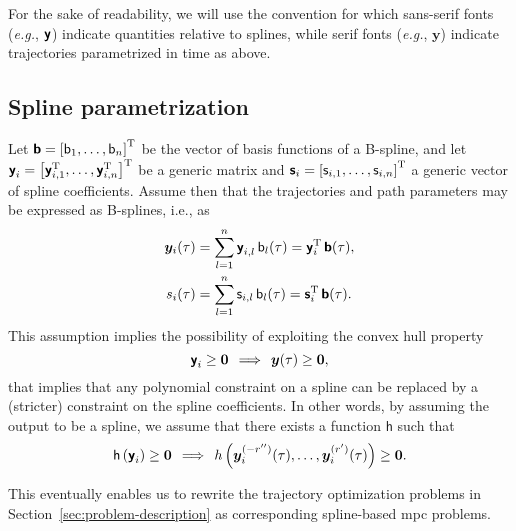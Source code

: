 For the sake of readability, we will use the convention for which sans-serif fonts (\emph{e.g.}, $\boldsymbol{\mathsf{y}}$) indicate quantities relative to splines, while serif fonts (\emph{e.g.}, $\bm{y}$) indicate trajectories parametrized in time as above. %



\subsection{Spline parametrization}
\label{ssec:spline_param}



Let $\boldsymbol{\mathsf{b}} = \left[\mathsf{b}_1, \ldots, \mathsf{b}_n\right]^{\mathrm{T}}$ be the vector of basis functions of a B-spline, and let $\boldsymbol{\mathsf{y}}_i = \left[\boldsymbol{\mathsf{y}}_{i,1}^{\mathrm{T}}, \ldots, \boldsymbol{\mathsf{y}}_{i,n}^{\mathrm{T}}\right]^{\mathrm{T}}$ be a generic matrix and $\boldsymbol{\mathsf{s}}_i = \left[\mathsf{s}_{i,1}, \ldots, \mathsf{s}_{i,n}\right]^{\mathrm{T}}$ a generic vector of spline coefficients. Assume then that the trajectories and path parameters may be expressed as B-splines, i.e., as
%
\begin{align}
    \bm{y}_i(\tau) &= \sum_{l=1}^n \boldsymbol{\mathsf{y}}_{i,l}\,\mathsf{b}_l(\tau) = \boldsymbol{\mathsf{y}}_i^{\mathrm{T}}\,\boldsymbol{\mathsf{b}}(\tau), \\
    s_i(\tau) &= \sum_{l=1}^n \mathsf{s}_{i,l}\,\mathsf{b}_l(\tau) = \boldsymbol{\mathsf{s}}_i^{\mathrm{T}}\,\boldsymbol{\mathsf{b}}(\tau).
\end{align}
%
This assumption implies the possibility of exploiting the convex hull property
\begin{equation}
    \boldsymbol{\mathsf{y}}_i \geq \bm{0} \, \implies \, \bm{y}(\tau) \geq \bm{0},
\end{equation}
that implies that any polynomial constraint on a spline can be replaced by a (stricter) constraint on the spline coefficients.
In other words, by assuming the output to be a spline, we assume that there exists a function $\mathsf{h}$ such that
\begin{equation}
    \mathsf{h}\left(\boldsymbol{\mathsf{y}}_i\right) \geq \bm{0}
    \, \implies \,
    h\left(\bm{y}_i^{(-r'')}(\tau), \ldots, \bm{y}^{(r')}_i(\tau)\right) \geq \bm{0}.
\end{equation}

This eventually enables us to rewrite the trajectory optimization problems in Section~\ref{sec:problem-description} as corresponding spline-based \gls{mpc} problems. %

